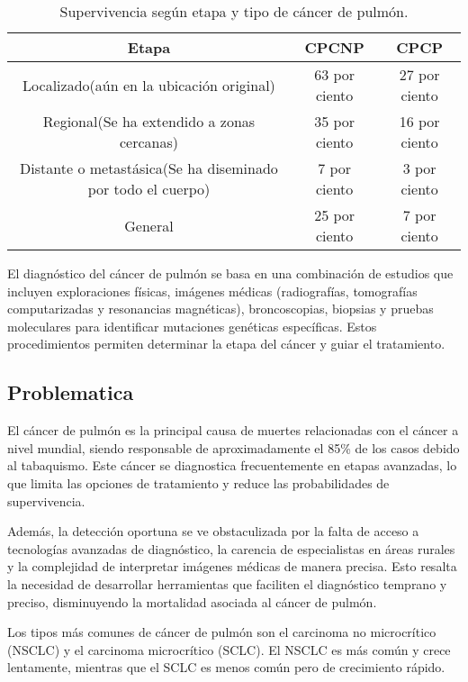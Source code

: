 \begin{table}[h!]
\centering
\begin{tabular}{|c|c|c|}
\hline
Etapa & CPCNP & CPCP \\
\hline
Localizado(aún en la ubicación original) & 63 por ciento & 27 por ciento \\
\hline
Regional(Se ha extendido a zonas cercanas)& 35 por ciento & 16 por ciento \\
\hline
Distante o metastásica(Se ha diseminado por todo el cuerpo)& 7 por ciento & 3 por ciento \\
\hline
General & 25 por ciento & 7 por ciento \\
\hline
\end{tabular}
\caption{Supervivencia según etapa y tipo de cáncer de pulmón.}
\end{table}


El diagnóstico del cáncer de pulmón se basa en una combinación de estudios que incluyen exploraciones físicas, imágenes médicas (radiografías, tomografías computarizadas y resonancias magnéticas), broncoscopias, biopsias y pruebas moleculares para identificar mutaciones genéticas específicas. Estos procedimientos permiten determinar la etapa del cáncer y guiar el tratamiento.

\subsection{Problematica}
El cáncer de pulmón es la principal causa de muertes relacionadas con el cáncer a nivel mundial, siendo responsable de aproximadamente el 85\% de los casos debido al tabaquismo\parencite{WHO2025}. Este cáncer se diagnostica frecuentemente en etapas avanzadas, lo que limita las opciones de tratamiento y reduce las probabilidades de supervivencia.

Además, la detección oportuna se ve obstaculizada por la falta de acceso a tecnologías avanzadas de diagnóstico, la carencia de especialistas en áreas rurales y la complejidad de interpretar imágenes médicas de manera precisa. Esto resalta la necesidad de desarrollar herramientas que faciliten el diagnóstico temprano y preciso, disminuyendo la mortalidad asociada al cáncer de pulmón\parencite{mayoclinic_lung_cancer}.

Los tipos más comunes de cáncer de pulmón son el carcinoma no microcrítico (NSCLC) y el carcinoma microcrítico (SCLC). El NSCLC es más común y crece lentamente, mientras que el SCLC es menos común pero de crecimiento rápido\parencite{WHO2025}.

